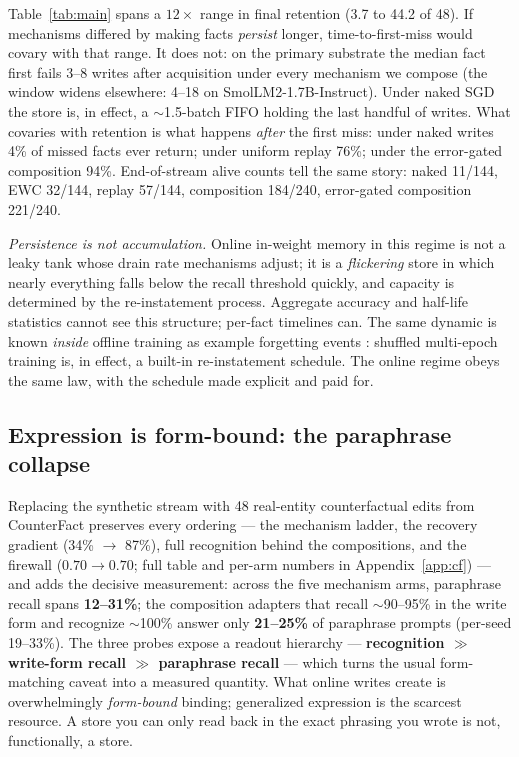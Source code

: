 \documentclass[11pt]{article}
\newcommand{\smol}{SmolLM2-1.7B-Instruct}
\begin{document}
Table~\ref{tab:main} spans a $12\times$ range in final retention (3.7 to 44.2 of 48). If
mechanisms differed by making facts \emph{persist} longer, time-to-first-miss would covary with
that range. It does not: on the primary substrate the median fact first fails 3--8 writes after
acquisition under every mechanism we compose (the window widens elsewhere: 4--18 on \smol{}). Under naked SGD the store is, in effect, a $\sim$1.5-batch
FIFO holding the last handful of writes. What covaries with retention is what happens \emph{after} the first
miss: under naked writes 4\% of missed facts ever return; under uniform replay 76\%; under the
error-gated composition 94\%. End-of-stream alive counts tell the same story: naked 11/144, EWC
32/144, replay 57/144, composition 184/240, error-gated composition 221/240.

\emph{Persistence is not accumulation.} Online in-weight memory in this regime is not a leaky
tank whose drain rate mechanisms adjust; it is a \emph{flickering} store in which nearly
everything falls below the recall threshold quickly, and capacity is determined by the
re-instatement process. Aggregate accuracy and half-life statistics cannot see this structure;
per-fact timelines can. The same dynamic is known \emph{inside} offline training as example
forgetting events \citep{toneva2019}: shuffled multi-epoch training is, in effect, a built-in
re-instatement schedule. The online regime obeys the same law, with the schedule made explicit
and paid for.

\subsection{Expression is form-bound: the paraphrase collapse}\label{sec:paraphrase}

Replacing the synthetic stream with 48 real-entity counterfactual edits from CounterFact
\citep{meng2022rome} preserves every ordering --- the mechanism ladder, the recovery gradient
(34\% $\to$ 87\%), full recognition behind the compositions, and the firewall
($0.70\to0.70$; full table and per-arm numbers in Appendix~\ref{app:cf}) --- and adds the
decisive measurement: across the five mechanism arms, paraphrase recall spans
\textbf{12--31\%}; the composition adapters that recall $\sim$90--95\% in the write form and
recognize $\sim$100\% answer only \textbf{21--25\%} of paraphrase prompts (per-seed
19--33\%). The three probes
expose a readout hierarchy --- \textbf{recognition $\gg$ write-form recall $\gg$ paraphrase
recall} --- which turns the usual form-matching caveat into a measured quantity. What online
writes create is overwhelmingly \emph{form-bound} binding; generalized expression is the
scarcest resource. A store you can only read back in the exact phrasing you wrote is not,
functionally, a store.
\end{document}
